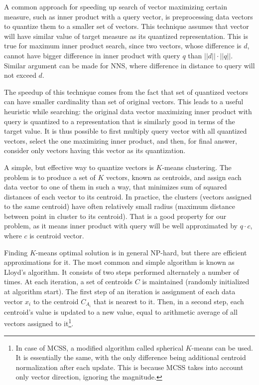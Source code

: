 A common approach for speeding up search of vector maximizing certain measure,
such as inner product with a query vector, is preprocessing data vectors to
quantize them to a smaller set of vectors. This technique assumes that vector
will have similar value of target measure as its quantized representation.
This is true for maximum inner product search, since two vectors,
whose difference is $d$, cannot have bigger difference in inner product with
query $q$ than $||d|| \cdot ||q||$. Similar argument can be made for NNS,
where difference in distance to query will not exceed $d$.

The speedup of this technique comes from the fact that set of quantized vectors
can have smaller cardinality than set of original vectors. This leads to a 
useful heuristic while searching: the original data vector maximizing 
inner product with query is quantized to a representation that is similarly
good in terms of the target value. It is thus possible to first multiply 
query vector with all quantized vectors, select the one maximizing inner
product, and then, for final answer, consider only vectors having this vector
as its quantization.

A simple, but effective way to quantize vectors is $K$-means clustering.
The problem is to produce a set of $K$ vectors, known as centroids, and assign
each data vector to one of them in such a way, that minimizes sum of squared
distances of each vector to its centroid. In practice, the clusters (vectors
assigned to the same centroid) have often relatively small radius (maximum
distance between point in cluster to its centroid). That is a good property 
for our problem, as it means inner product with query will be well approximated
by $q \cdot c$, where $c$ is centroid vector.

Finding $K$-means optimal solution is in general NP-hard, but there are efficient
approximations for it. The most common and simple algorithm is known as 
Lloyd's algorithm. It consists of two steps performed alternately a number of
times. At each iteration, a set of centroids $C$ is maintained (randomly
initialized at algorithm start). The first
step of an iteration is assignment of each data vector $x_i$ to the
centroid $C_{A_i}$ that
is nearest to it. Then, in a second step, each centroid's value is updated
to a new value, equal to arithmetic average of all vectors assigned to
it\footnote{
In case of MCSS, a modified algorithm called spherical $K$-means can be used.
It is essentially the same, with the only difference being additional
centroid normalization after each update. This is because MCSS
takes into account only vector direction, ignoring the magnitude.
}.

